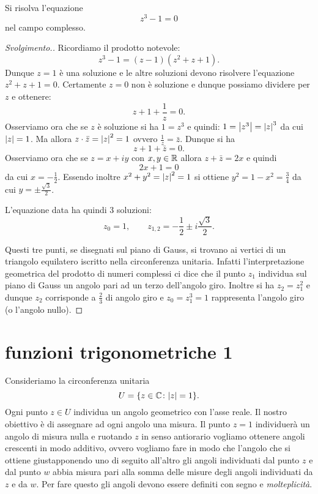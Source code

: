 \begin{exercise}
Si risolva l'equazione 
\[ 
 z^3 - 1 = 0
\]
nel campo complesso.
\end{exercise}
%
\begin{proof}[Svolgimento.]
Ricordiamo il prodotto notevole:
\[
  z^3 - 1 = (z-1)(z^2+z+1).
\]
Dunque $z=1$ è una soluzione e le altre soluzioni devono risolvere 
l'equazione $z^2+z+1=0$. 
Certamente $z=0$ non è soluzione e dunque possiamo dividere per $z$ 
e ottenere:
\[
  z + 1 + \frac 1 z = 0.
\]
Osserviamo ora che se $z$ è soluzione si ha $1=z^3$
e quindi: $1 = {\left|z^3\right|}= {\left|z\right|}^3$ da cui ${\left|z\right|} = 1$.
Ma allora $z\cdot \bar z = {\left|z\right|}^2 = 1$ ovvero $\frac 1 z = \bar z$.
Dunque si ha 
\[
    z + 1 + \bar z = 0.
\]
Osserviamo ora che se $z=x+iy$ con $x,y\in {\mathbb R}$ allora $z+\bar z = 2x$
e quindi 
\[
    2x + 1 = 0 
\]
da cui $x=-\frac 1 2$. Essendo inoltre $x^2+y^2={\left|z\right|}^2=1$ si ottiene
$y^2 = 1-x^2 = \frac 3 4$ da cui $y=\pm \frac{\sqrt 3}{2}$.

L'equazione data ha quindi $3$ soluzioni:
\[
z_0 = 1, \qquad 
z_{1,2} = -\frac 1 2 \pm i \frac{\sqrt 3} 2.
\]

Questi tre punti, se disegnati sul piano di Gauss, si trovano 
ai vertici di un triangolo equilatero iscritto nella circonferenza unitaria.
Infatti l'interpretazione geometrica del prodotto di numeri complessi ci dice 
che il punto $z_1$ individua sul piano di Gauss un angolo pari 
ad un terzo dell'angolo giro. Inoltre si ha $z_2 = z_1^2$ e dunque 
$z_2$ corrisponde a $\frac 2 3$ di angolo giro e $z_0=z_1^3 = 1$ rappresenta 
l'angolo giro (o l'angolo nullo).
\end{proof}

\section{funzioni trigonometriche 1}
\label{sec:avvolgimento}

Consideriamo la circonferenza unitaria 
\[
  U = {\left\{ z\in {\mathbb C}\colon {\left|z\right|} = 1 \right\}}.
\]
Ogni punto $z\in U$ individua un angolo geometrico con l'asse reale.
Il nostro obiettivo è di assegnare ad ogni angolo una misura.
Il punto $z=1$ individuerà un angolo di misura nulla e 
ruotando $z$ in senso antiorario vogliamo ottenere angoli crescenti
in modo additivo, ovvero vogliamo fare in modo che l'angolo che si ottiene 
giustapponendo uno di seguito all'altro gli angoli individuati 
dal punto $z$ e dal punto $w$ abbia misura pari alla somma delle misure 
degli angoli individuati da $z$ e da $w$.
Per fare questo gli angoli devono essere definiti con segno e \emph{molteplicità}.

